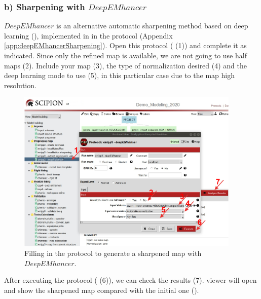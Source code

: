 \subsubsection*{b) Sharpening with $DeepEMhancer$}

$DeepEMhancer$ is an alternative automatic sharpening method based on deep learning (\citep{Sanchez-Garcia2020.06.12.148296}), implemented in \scipion in the protocol  (Appendix \ref{app:deepEMhancerSharpening}). Open this protocol ( (1)) and complete it as indicated. Since only the refined map is available, we are not going to use half maps (2). Include your map (3), the type of normalization desired (4) and the deep learning mode to use (5), in this particular case  due to the map high resolution.

 
 \begin{figure}[H]
  \centering 
  \captionsetup{width=.9\linewidth} 
  \includegraphics[width=0.95\textwidth]
  {Images/Fig63}
  \caption{Filling in the protocol to generate a sharpened map with $DeepEMhancer$.}
  \label{fig:deepEMHancer_1}
  \end{figure}

After executing the protocol ( (6)), we can check the results (7). \chimera viewer will open and show the sharpened map compared with the initial one ().

